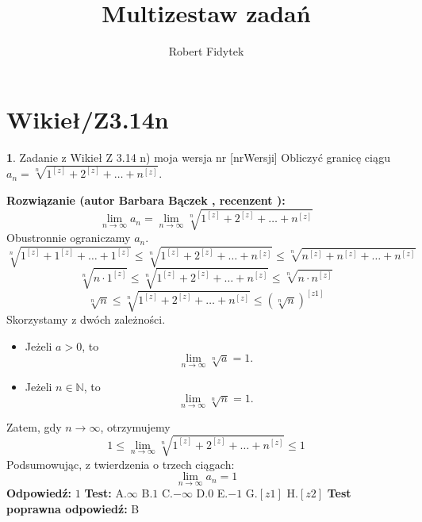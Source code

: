 \documentclass[12pt, a4paper]{article}
\title{Multizestaw zadań}
\author{Robert Fidytek}
\date{}
\theoremstyle{definition} %
\newtheorem{zad}{}
\newcommand{\kategoria}[1]{\section{#1}} %
\newcommand{\zadStart}[1]{\begin{zad}#1\newline} %
\newcommand{\zadStop}{\end{zad}}   %
\newcommand{\rozwStart}[2]{\noindent \textbf{Rozwiązanie (autor #1 , recenzent #2): }\newline} %
\newcommand{\rozwStop}{\newline}                                            %
\newcommand{\odpStart}{\noindent \textbf{Odpowiedź:}\newline}    %
\newcommand{\odpStop}{\newline}                                             %
\newcommand{\testStart}{\noindent \textbf{Test:}\newline} %
\newcommand{\testStop}{\newline} %
\newcommand{\kluczStart}{\noindent \textbf{Test poprawna odpowiedź:}\newline} %
\newcommand{\kluczStop}{\newline} %
\begin{document}
\maketitle


\kategoria{Wikieł/Z3.14n}
\zadStart{Zadanie z Wikieł Z 3.14 n) moja wersja nr [nrWersji]}
Obliczyć granicę ciągu $a_n= \sqrt[n]{1^{[z]}+2^{[z]}+ \ldots + n^{[z]}}$.
\zadStop
\rozwStart{Barbara Bączek}{}
$$\lim_{n \rightarrow \infty} a_n= \lim_{n \rightarrow \infty} \sqrt[n]{1^{[z]}+2^{[z]}+ \ldots + n^{[z]}}$$
Obustronnie ograniczamy $a_n$. 
$$\sqrt[n]{1^{[z]}+1^{[z]}+ \ldots + 1^{[z]}}  \leq \sqrt[n]{1^{[z]}+2^{[z]}+ \ldots + n^{[z]}} \leq \sqrt[n]{n^{[z]}+n^{[z]}+ \ldots + n^{[z]}} $$
$$\sqrt[n]{n \cdot 1^{[z]}}  \leq \sqrt[n]{1^{[z]}+2^{[z]}+ \ldots + n^{[z]}} \leq \sqrt[n]{n \cdot n^{[z]}} $$
$$\sqrt[n]{n}  \leq \sqrt[n]{1^{[z]}+2^{[z]}+ \ldots + n^{[z]}} \leq {(\sqrt[n]{n})}^{[z1]} $$
Skorzystamy z dwóch zależności.
\begin{itemize}
\item Jeżeli $a>0$, to $$\lim_{n \rightarrow \infty} \sqrt[n]{a}=1.$$
\item Jeżeli $n \in \mathbb{N}$, to $$\lim_{n \rightarrow \infty} \sqrt[n]{n}=1.$$
\end{itemize}
Zatem, gdy $n \rightarrow \infty$, otrzymujemy
$$ 1 \leq \lim_{n \rightarrow \infty} \sqrt[n]{1^{[z]}+2^{[z]}+ \ldots + n^{[z]}} \leq 1$$
Podsumowując, z twierdzenia o trzech ciągach:  $$\lim_{n \rightarrow \infty} a_n= 1$$
\rozwStop
\odpStart
$1$
\odpStop
\testStart
A.$\infty$
B.$1$
C.$-\infty$
D.$0$
E.$-1$
G.$[z1]$
H.$[z2]$
\testStop
\kluczStart
B
\kluczStop
\end{document}
